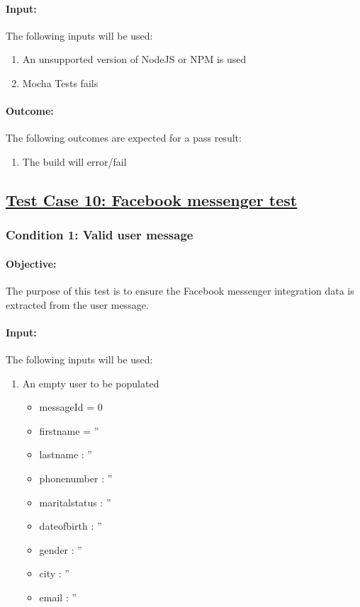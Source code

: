 \documentclass{article}
\begin{document}
\paragraph{Input:} The following inputs will be used:
\begin{enumerate}
	\item An unsupported version of NodeJS or NPM is used
	\item Mocha Tests fails
\end{enumerate}
\paragraph{Outcome:} The following outcomes are expected for a pass result:
\begin{enumerate}
	\item The build will error/fail
\end{enumerate}

\pagebreak

\subsection{\underline{Test Case 10: Facebook messenger test}}\label{test10}
\subsubsection{Condition 1: Valid user message}
\paragraph{Objective:} The purpose of this test is to ensure the Facebook messenger integration data is extracted from the user message.
\paragraph{Input:} The following inputs will be used:
\begin{enumerate}
	\item An empty user to be populated
	\begin{itemize}
  	\item messageId = 0
    \item firstname = ''
    \item lastname : ''
    \item phonenumber : ''
    \item maritalstatus : ''
    \item dateofbirth : ''
    \item gender : ''
    \item city : ''
    \item email : ''
    \end{itemize}	  
\end{enumerate}
\end{document}
